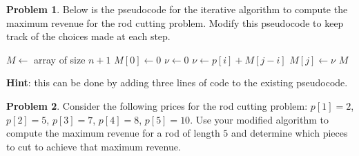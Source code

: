 \documentclass[10pt]{article}
\theoremstyle{definition}
\newtheorem{problem}{Problem}
\newenvironment{solution}{\begin{proof}[Solution]}{\end{proof}}
\begin{document}
\newpage
\begin{problem}
    Below is the pseudocode for the iterative algorithm to compute the maximum revenue for the rod cutting problem. Modify this pseudocode to keep track of the choices made at each step. 
    
    \begin{algorithm}
    \caption{Rod Cutting Iterative Algorithm}
    \begin{algorithmic}[1]
        \State $M \gets$ array of size $n+1$
        \State $M[0] \gets 0$
            \State $\nu \gets 0$
                    \State $\nu \gets p[i] + M[j - i]$ 
                \EndIf
            \EndFor
            \State $M[j] \gets \nu$
        \EndFor
        \State \Return $M$
    \EndFunction
    \end{algorithmic}
    \end{algorithm}

    \noindent \textbf{Hint}: this can be done by adding three lines of code to the existing pseudocode.
\end{problem}




\begin{problem}
    Consider the following prices for the rod cutting problem: $p[1] = 2$, $p[2] = 5$, $p[3] = 7$, $p[4] = 8$, $p[5] = 10$. Use your modified algorithm to compute the maximum revenue for a rod of length $5$ and determine which pieces to cut to achieve that maximum revenue.
\end{problem}
\end{document}
